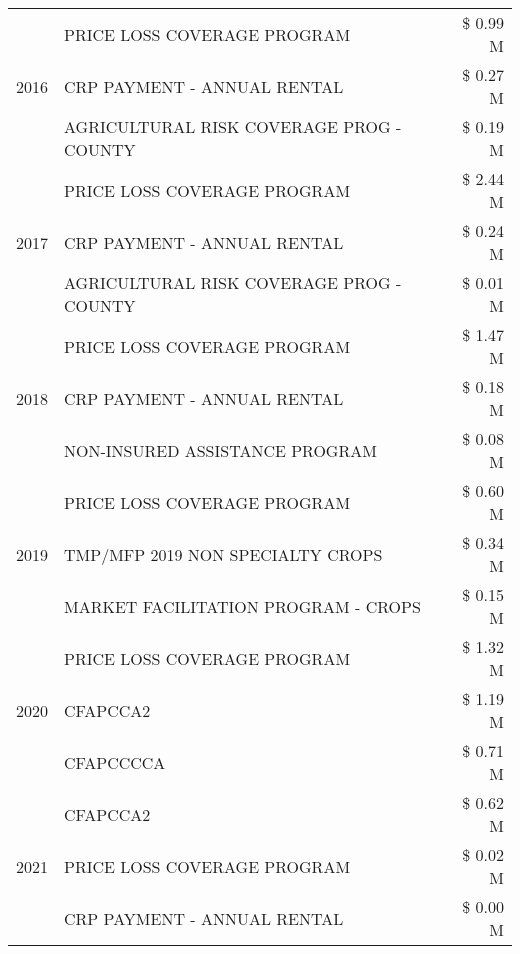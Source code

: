 \begin{tabular}{llr}
\multirow[t]{3}{*}{2016} & PRICE LOSS COVERAGE PROGRAM                   & \$ 0.99 M \\
 & CRP PAYMENT - ANNUAL RENTAL                   & \$ 0.27 M \\
 & AGRICULTURAL RISK COVERAGE PROG - COUNTY      & \$ 0.19 M \\
\cline{1-3}
\multirow[t]{3}{*}{2017} & PRICE LOSS COVERAGE PROGRAM & \$ 2.44 M \\
 & CRP PAYMENT - ANNUAL RENTAL & \$ 0.24 M \\
 & AGRICULTURAL RISK COVERAGE PROG - COUNTY & \$ 0.01 M \\
\cline{1-3}
\multirow[t]{3}{*}{2018} & PRICE LOSS COVERAGE PROGRAM & \$ 1.47 M \\
 & CRP PAYMENT - ANNUAL RENTAL & \$ 0.18 M \\
 & NON-INSURED ASSISTANCE PROGRAM & \$ 0.08 M \\
\cline{1-3}
\multirow[t]{3}{*}{2019} & PRICE LOSS COVERAGE PROGRAM & \$ 0.60 M \\
 & TMP/MFP 2019 NON SPECIALTY CROPS & \$ 0.34 M \\
 & MARKET FACILITATION PROGRAM - CROPS & \$ 0.15 M \\
\cline{1-3}
\multirow[t]{3}{*}{2020} & PRICE LOSS COVERAGE PROGRAM & \$ 1.32 M \\
 & CFAPCCA2 & \$ 1.19 M \\
 & CFAPCCCCA & \$ 0.71 M \\
\cline{1-3}
\multirow[t]{3}{*}{2021} & CFAPCCA2 & \$ 0.62 M \\
 & PRICE LOSS COVERAGE PROGRAM & \$ 0.02 M \\
 & CRP PAYMENT - ANNUAL RENTAL & \$ 0.00 M \\
\cline{1-3}
\bottomrule
\end{tabular}
